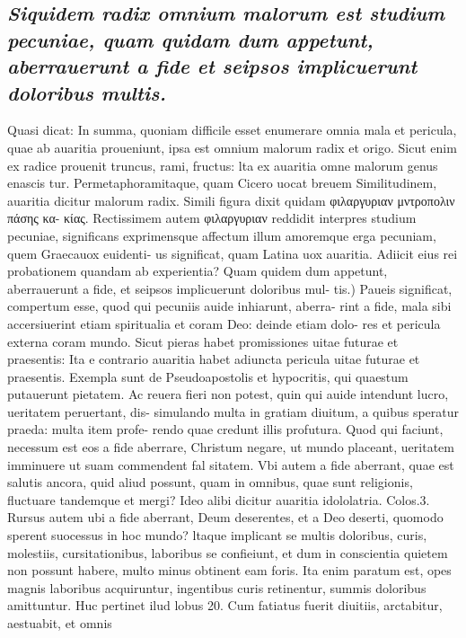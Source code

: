 \documentclass{article}
\begin{document}
\begin{pages}
\subsection*{\textit{Siquidem radix omnium malorum est studium pecuniae, quam quidam dum appetunt, aberrauerunt a fide et seipsos implicuerunt doloribus multis. }}\pstart Quasi dicat: In summa, quoniam difficile esset enumerare omnia mala et pericula, quae ab auaritia proueniunt, ipsa est omnium malorum radix et origo. Sicut enim ex radice prouenit truncus, rami, fructus: lta ex auaritia omne malorum genus enascis tur. Permetaphoramitaque, quam Cicero uocat breuem Similitudinem, auaritia dicitur malorum radix. Simili figura dixit quidam φιλαργυριαν μντροπολιν πάσης κα- κίας. Rectissimem autem φιλαργυριαν reddidit interpres studium pecuniae, significans exprimensque affectum illum amoremque erga pecuniam, quem Graecauox euidenti- us significat, quam Latina uox auaritia. Adiicit eius rei probationem quandam ab experientia?  \pend\pstart Quam quidem dum appetunt, aberrauerunt a fide, et seipsos implicuerunt doloribus mul- tis.) Paueis significat, compertum esse, quod qui pecuniis auide inhiarunt, aberra- rint a fide, mala sibi accersiuerint etiam spiritualia et coram Deo: deinde etiam dolo- res et pericula externa coram mundo. Sicut pieras habet promissiones uitae futurae et praesentis: Ita e contrario auaritia habet adiuncta pericula uitae futurae et praesentis. Exempla sunt de Pseudoapostolis et hypocritis, qui quaestum putauerunt pietatem. Ac reuera fieri non potest, quin qui auide intendunt lucro, ueritatem peruertant, dis- simulando multa in gratiam diuitum, a quibus speratur praeda: multa item profe- rendo quae credunt illis profutura. Quod qui faciunt, necessum est eos a fide aberrare, Christum negare, ut mundo placeant, ueritatem imminuere ut suam commendent fal sitatem. Vbi autem a fide aberrant, quae est salutis ancora, quid aliud possunt, quam in omnibus, quae sunt religionis, fluctuare tandemque et mergi? Ideo alibi dicitur auaritia idololatria. Colos.3. Rursus autem ubi a fide aberrant, Deum deserentes, et a Deo deserti, quomodo sperent suocessus in hoc mundo? ltaque implicant se multis doloribus, curis, molestiis, cursitationibus, laboribus se confieiunt, et dum in conscientia quietem non possunt habere, multo minus obtinent eam foris. Ita enim paratum est, opes magnis laboribus acquiruntur, ingentibus curis retinentur, summis doloribus amittuntur. Huc pertinet ilud lobus 20. Cum fatiatus fuerit diuitiis, arctabitur, aestuabit, et omnis  \pend
\vspace{0.5cm}\noindent

\end{pages}
\end{document}
